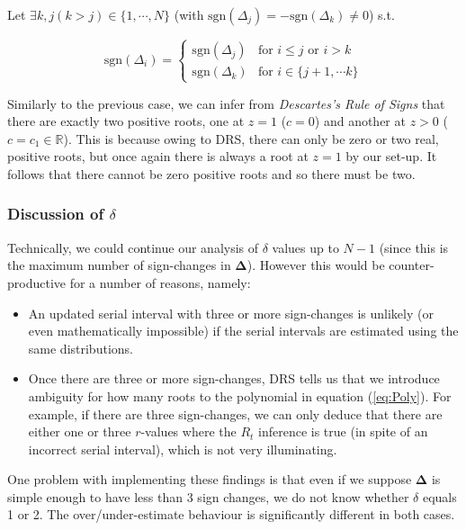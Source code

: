 \documentclass[10pt,journal,compsoc]{IEEEtran}
\begin{document}
Let $\exists k, j (k>j) \in \{ 1, \cdots,  N \}$ (with $\mathrm{sgn}(\Delta_j) = -\mathrm{sgn}(\Delta_k) \neq 0 $) s.t.


\begin{equation}
  \mathrm{sgn}(\Delta_i) =
    \begin{cases}
      \mathrm{sgn}(\Delta_j) & \text{for } i \leq j \text{ or } i > k\\
      \mathrm{sgn}(\Delta_k) & \text{for } i \in \{ j+1, \cdots k \}
    \end{cases}       
\end{equation}

Similarly to the previous case, we can infer from \textit{Descartes's Rule of Signs} that there are exactly two positive roots, one at $z=1$ ($c = 0$) and another at $z>0$ ($c = c_1 \in \mathbb{R}$). This is because owing to DRS, there can only be zero or two real, positive roots, but once again there is always a root at $z=1$ by our set-up. It follows that there cannot be zero positive roots and so there must be two.\\

\subsubsection*{Discussion of $\delta$}

Technically, we could continue our analysis of $\delta$ values up to $N-1$ (since this is the maximum number of sign-changes in $\boldsymbol{\Delta}$). However this would be counter-productive for a number of reasons, namely:

\begin{itemize}
    \item An updated serial interval with three or more sign-changes is unlikely (or even mathematically impossible) if the serial intervals are estimated using the same distributions.
    \item Once there are three or more sign-changes, DRS tells us that we introduce ambiguity for how many roots to the polynomial in equation (\ref{eq:Poly}). For example, if there are three sign-changes, we can only deduce that there are either one or three $r$-values where the $R_t$ inference is true (in spite of an incorrect serial interval), which is not very illuminating.
\end{itemize}

One problem with implementing these findings is that even if we suppose $\boldsymbol{\Delta}$ is simple enough to have less than 3 sign changes, we do not know whether $\delta$ equals 1 or 2. The over/under-estimate behaviour is significantly different in both cases.
\end{document}
